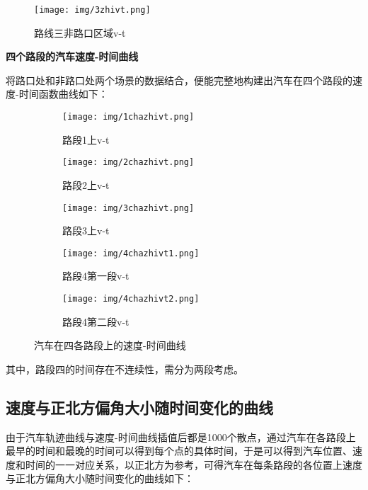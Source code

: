 \documentclass[withoutpreface,bwprint]{cumcmthesis} %
\begin{document}
\begin{figure}[htbp]
    \centering
    \texttt{[image: img/3zhivt.png]}
     \captionsetup{font=small, position=below}
    \caption{路线三非路口区域v-t}
\end{figure}


\textbf{四个路段的汽车速度-时间曲线}

将路口处和非路口处两个场景的数据结合，便能完整地构建出汽车在四个路段的速度-时间函数曲线如下：
\newpage

\begin{figure}[htbp]
	\centering
	\begin{subfigure}{0.32\linewidth}
		\centering
		\texttt{[image: img/1chazhivt.png]}
   \captionsetup{font=small, position=below}
		\caption{路段1上v-t}
	\end{subfigure}
	\centering
	\begin{subfigure}{0.325\linewidth}
		\centering
		\texttt{[image: img/2chazhivt.png]}
   \captionsetup{font=small, position=below}
		\caption{路段2上v-t}
		
	\end{subfigure}
	\centering
	\begin{subfigure}{0.325\linewidth}
		\centering
		\texttt{[image: img/3chazhivt.png]}
   \captionsetup{font=small, position=below}
		\caption{路段3上v-t}
		
	\end{subfigure}
	\quad
\centering
	\begin{subfigure}{0.325\linewidth}
		\centering
		\texttt{[image: img/4chazhivt1.png]}
   \captionsetup{font=small, position=below}
		\caption{路段4第一段v-t}
		
	\end{subfigure}
\centering
	\begin{subfigure}{0.325\linewidth}
		\centering
		\texttt{[image: img/4chazhivt2.png]}
   \captionsetup{font=small, position=below}
		\caption{路段4第二段v-t}
		
	\end{subfigure}
  \captionsetup{font=small, position=below}
\caption{汽车在四各路段上的速度-时间曲线}
\end{figure}


其中，路段四的时间存在不连续性，需分为两段考虑。


\subsection{速度与正北方偏角大小随时间变化的曲线}
由于汽车轨迹曲线与速度-时间曲线插值后都是1000个散点，通过汽车在各路段上最早的时间和最晚的时间可以得到每个点的具体时间，于是可以得到汽车位置、速度和时间的一一对应关系，以正北方为参考，可得汽车在每条路段的各位置上速度与正北方偏角大小随时间变化的曲线如下：
\end{document}
